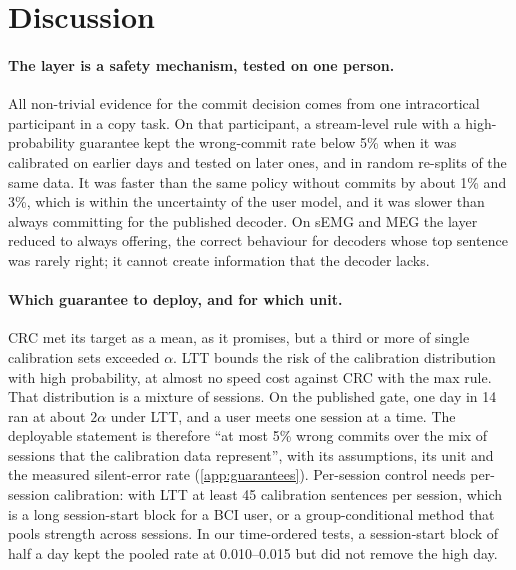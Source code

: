 \section{Discussion}
\label{sec:discussion}

\paragraph{The layer is a safety mechanism, tested on one person.} All non-trivial evidence for the commit decision comes from one intracortical participant in a copy task. On that participant, a stream-level rule with a high-probability guarantee kept the wrong-commit rate below 5\% when it was calibrated on earlier days and tested on later ones, and in random re-splits of the same data. It was faster than the same policy without commits by about 1\% and 3\%, which is within the uncertainty of the user model, and it was slower than always committing for the published decoder. On sEMG and MEG the layer reduced to always offering, the correct behaviour for decoders whose top sentence was rarely right; it cannot create information that the decoder lacks.

\paragraph{Which guarantee to deploy, and for which unit.} CRC met its target as a mean, as it promises, but a third or more of single calibration sets exceeded $\alpha$. LTT bounds the risk of the calibration distribution with high probability, at almost no speed cost against CRC with the max rule. That distribution is a mixture of sessions. On the published gate, one day in 14 ran at about $2\alpha$ under LTT, and a user meets one session at a time. The deployable statement is therefore ``at most 5\% wrong commits over the mix of sessions that the calibration data represent'', with its assumptions, its unit and the measured silent-error rate (\cref{app:guarantees}). Per-session control needs per-session calibration: with LTT at least 45 calibration sentences per session, which is a long session-start block for a BCI user, or a group-conditional method that pools strength across sessions. In our time-ordered tests, a session-start block of half a day kept the pooled rate at 0.010--0.015 but did not remove the high day.

